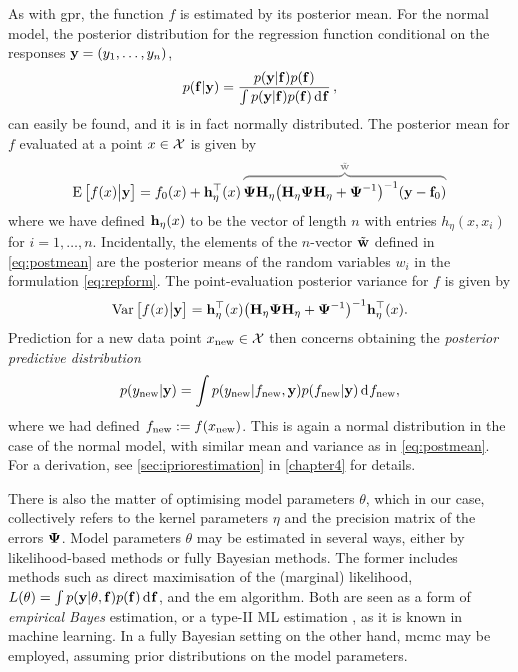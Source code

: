 \documentclass[11pt,twoside,openright,showframe]{report}
\begin{document}
As with \gls*{gpr}, the function $f$ is estimated by its posterior mean.
For the normal model, the posterior distribution for the regression function conditional on the responses ${\mathbf y} = (y_1,\dots,y_n)$,
\begin{equation}
  p({\mathbf f}|{\mathbf y}) = \frac{p({\mathbf y}|{\mathbf f})p({\mathbf f})}{\int p({\mathbf y}|{\mathbf f})p({\mathbf f}) \operatorname{d}\hspace{0.5pt}\! {\mathbf f}} \, ,
\end{equation}
can easily be found, and it is in fact normally distributed.
The posterior mean for $f$ evaluated at a point $x \in {\mathcal X}$ is given by
\vspace{-0.3em}
\begin{equation}\label{eq:postmean}
  \E\big[f(x)\big|\by\big] 
  = f_0(x) + \bh_\eta^\top(x) \,
  \myoverbrace{\bPsi\bH_\eta \big(\bH_\eta\bPsi\bH_\eta + \bPsi^{-1}\big)^{-1} (\by -\bff_0 )}{\tilde \bw}
\end{equation}
where we have defined ${\mathbf h}_\eta(x)$ to be the vector of length $n$ with entries $h_\eta(x,x_i)$ for $i=1,\dots,n$.
Incidentally, the elements of the $n$-vector $\tilde {{\mathbf w}}$ defined in \cref{eq:postmean} are the posterior means of the random variables $w_i$ in the formulation \cref{eq:repform}.
The point-evaluation posterior variance for $f$ is given by
\begin{align}\label{eq:postvar}
  \operatorname{Var}\big[f(x)\big|{\mathbf y}\big] = {\mathbf h}_\eta^\top(x)\big( {\mathbf H}_\eta{\bm\Psi}{\mathbf H}_\eta + {\bm\Psi}^{-1} \big)^{-1} {\mathbf h}_\eta^\top(x).
\end{align}
Prediction for a new data point $x_{\text{new}} \in {\mathcal X}$ then concerns obtaining the \emph{posterior predictive distribution}
\[
  p(y_{\text{new}}|{\mathbf y}) = \int p(y_{\text{new}}|f_{\text{new}},{\mathbf y})p(f_{\text{new}}|{\mathbf y}) \operatorname{d}\hspace{0.5pt}\! f_{\text{new}},
\]
where we had defined $f_{\text{new}} := f(x_{\text{new}})$.
This is again a normal distribution in the case of the normal model, with similar mean and variance as in \cref{eq:postmean}. 
For a derivation, see \cref{sec:ipriorestimation} in \cref{chapter4} for details.


There is also the matter of optimising model parameters $\theta$, which in our case, collectively refers to the kernel parameters $\eta$ and the precision matrix of the errors ${\bm\Psi}$.
Model parameters $\theta$ may be estimated in several ways, either by likelihood-based methods or fully Bayesian methods.
The former includes methods such as direct maximisation of the (marginal) likelihood, $L(\theta) = \int p({\mathbf y}|\theta,{\mathbf f})p({\mathbf f})\operatorname{d}\hspace{0.5pt}\! {\mathbf f}$, and the \gls*{em} algorithm.
Both are seen as a form of \emph{empirical Bayes} estimation, or a type-II ML estimation \citep{bishop2006pattern}, as it is known in machine learning.
In a fully Bayesian setting on the other hand, \gls*{mcmc} may be employed, assuming prior distributions on the model parameters.
\end{document}
